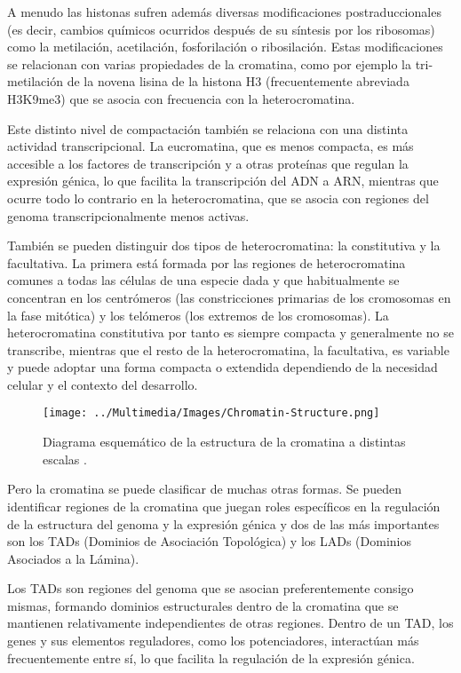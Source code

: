A menudo las histonas sufren además diversas modificaciones postraduccionales (es decir, cambios químicos ocurridos después de su síntesis por los ribosomas) como la metilación, acetilación, fosforilación o ribosilación. Estas modificaciones se relacionan con varias propiedades de la cromatina, como por ejemplo la tri-metilación de la novena lisina de la histona H3 (frecuentemente abreviada H3K9me3) que se asocia con frecuencia con la heterocromatina.

Este distinto nivel de compactación también se relaciona con una distinta actividad transcripcional. La eucromatina, que es menos compacta, es más accesible a los factores de transcripción y a otras proteínas que regulan la expresión génica, lo que facilita la transcripción del ADN a ARN, mientras que ocurre todo lo contrario en la heterocromatina, que se asocia con regiones del genoma transcripcionalmente menos activas.

También se pueden distinguir dos tipos de heterocromatina: la constitutiva y la facultativa. La primera está formada por las regiones de heterocromatina comunes a todas las células de una especie dada y que habitualmente se concentran en los centrómeros (las constricciones primarias de los cromosomas en la fase mitótica) y los telómeros (los extremos de los cromosomas). La heterocromatina constitutiva por tanto es siempre compacta y generalmente no se transcribe, mientras que el resto de la heterocromatina, la facultativa, es variable y puede adoptar una forma compacta o extendida dependiendo de la necesidad celular y el contexto del desarrollo.

\begin{figure}
    \centering
    \texttt{[image: ../Multimedia/Images/Chromatin-Structure.png]}
    \caption{Diagrama esquemático de la estructura de la cromatina a distintas escalas \cite{Felsenfeld2003}.}
    \label{fig:chromatin-structure}
\end{figure}

Pero la cromatina se puede clasificar de muchas otras formas. Se pueden identificar regiones de la cromatina que juegan roles específicos en la regulación de la estructura del genoma y la expresión génica y dos de las más importantes son los TADs (Dominios de Asociación Topológica) y los LADs (Dominios Asociados a la Lámina).

Los TADs son regiones del genoma que se asocian preferentemente consigo mismas, formando dominios estructurales dentro de la cromatina que se mantienen relativamente independientes de otras regiones. Dentro de un TAD, los genes y sus elementos reguladores, como los potenciadores, interactúan más frecuentemente entre sí, lo que facilita la regulación de la expresión génica.

